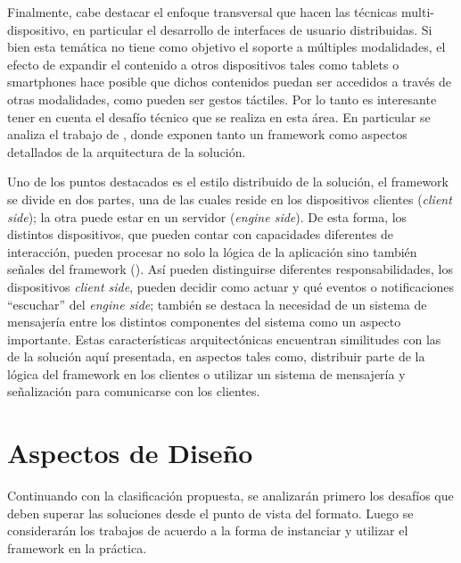 Finalmente, cabe destacar el enfoque transversal que hacen las técnicas multi-dispositivo, en particular el desarrollo de interfaces de usuario distribuidas. Si bien esta temática no tiene como objetivo el soporte a múltiples modalidades, el efecto de expandir el contenido a otros dispositivos tales como tablets o smartphones hace posible que dichos contenidos puedan ser accedidos a través de otras modalidades, como pueden ser gestos táctiles. Por lo tanto es interesante tener en cuenta el desafío técnico que se realiza en esta área.
En particular se analiza el trabajo de \citet{frosini2013framework}, donde exponen tanto un framework como aspectos detallados de la arquitectura de la solución. 

Uno de los puntos destacados es el estilo distribuido de la solución, el framework se divide en dos partes, una de las cuales reside en los dispositivos clientes (\emph{client side}); la otra puede estar en un servidor (\emph{engine side}). De esta forma, los distintos dispositivos, que pueden contar con capacidades diferentes de interacción, pueden procesar no solo la lógica de la aplicación sino también señales del framework (). Así pueden distinguirse diferentes responsabilidades, los dispositivos \emph{client side}, pueden decidir como actuar y qué eventos o notificaciones ``escuchar'' del \emph{engine side}; también se destaca la necesidad de un sistema de mensajería entre los distintos componentes del sistema como un aspecto importante. Estas características arquitectónicas encuentran similitudes con las de la solución aquí presentada, en aspectos tales como, distribuir parte de la lógica del framework en los clientes o utilizar un sistema de mensajería y señalización para comunicarse con los clientes.

\section{Aspectos de Diseño}
Continuando con la clasificación propuesta, se analizarán primero los desafíos que deben superar las soluciones desde el punto de vista del formato. Luego se considerarán los trabajos de acuerdo a la forma de instanciar y utilizar el framework en la práctica.

